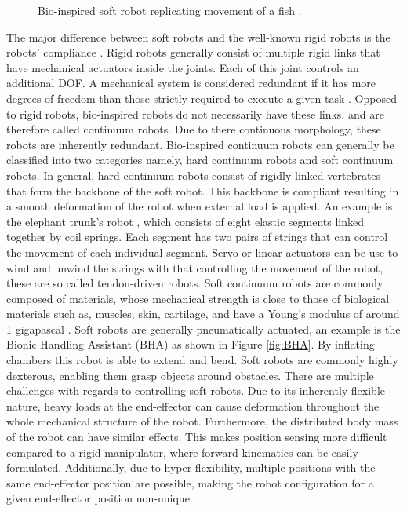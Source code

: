 \begin{minipage}{\linewidth}
\begin{minipage}{0.44\linewidth}
\begin{figure}[H]
              \caption{Bio-inspired soft robot replicating movement of a fish \cite{marchese2014autonomous}.}
          \end{figure}
      \end{minipage}
  \end{minipage}



The major difference between soft robots and the well-known rigid robots is the robots' compliance \cite{trivedi2008soft}. Rigid robots generally consist of multiple rigid links that have mechanical actuators inside the joints. Each of this joint controls an additional DOF. A mechanical system is considered redundant if it has more degrees of freedom than those strictly required to execute a given task \cite{chiaverini2016redundant}. Opposed to rigid robots, bio-inspired robots do not necessarily have these links, and are therefore called continuum robots. Due to there continuous morphology, these robots are inherently redundant. Bio-inspired continuum robots can generally be classified into two categories namely, hard continuum robots and soft continuum robots. In general, hard continuum robots consist of rigidly linked vertebrates that form the backbone of the soft robot. This backbone is compliant resulting in a smooth deformation of the robot when external load is applied. An example is the elephant trunk's robot \cite{cieslak1999elephant}, which consists of eight elastic segments linked together by coil springs. Each segment has two pairs of strings that can control the movement of each individual segment. Servo or linear actuators can be use to wind and unwind the strings with that controlling the movement of the robot, these are so called tendon-driven robots. Soft continuum robots are commonly composed of materials, whose mechanical strength is close to those of biological materials such as, muscles, skin, cartilage, and have a Young's modulus of around 1 gigapascal \cite{rus2015design}. Soft robots are generally pneumatically actuated, an example is the Bionic Handling Assistant (BHA) \cite{rolf2012constant} as shown in Figure \ref{fig:BHA}. By inflating chambers this robot is able to extend and bend. Soft robots are commonly highly dexterous, enabling them grasp objects around obstacles. There are multiple challenges with regards to controlling soft robots. Due to its inherently flexible nature, heavy loads at the end-effector can cause deformation throughout the whole mechanical structure of the robot. Furthermore, the distributed body mass of the robot can have similar effects. This makes position sensing more difficult compared to a rigid manipulator, where forward kinematics can be easily formulated. Additionally, due to hyper-flexibility, multiple positions with the same end-effector position are possible, making the robot configuration for a given end-effector position non-unique. 
